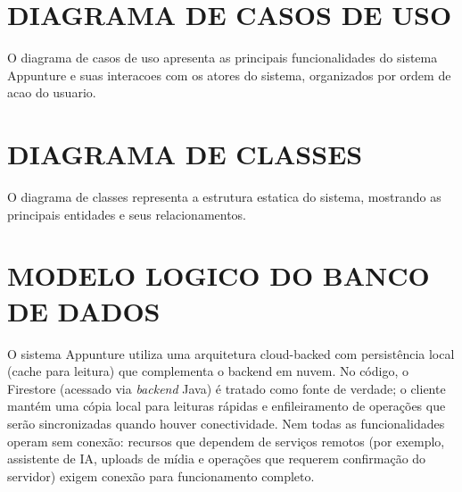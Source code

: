 
\begin{apendicesenv}

\chapter{DIAGRAMA DE CASOS DE USO}
\label{apendice:casos-uso}

O diagrama de casos de uso apresenta as principais funcionalidades do sistema Appunture e suas interacoes com os atores do sistema, organizados por ordem de acao do usuario.


\chapter{DIAGRAMA DE CLASSES}
\label{apendice:classes}

O diagrama de classes representa a estrutura estatica do sistema, mostrando as principais entidades e seus relacionamentos.


\chapter{MODELO LOGICO DO BANCO DE DADOS}
\label{apendice:modelo-logico}

O sistema Appunture utiliza uma arquitetura cloud-backed com persistência local (cache para leitura) que complementa o backend em nuvem. No código, o Firestore (acessado via \textit{backend} Java) é tratado como fonte de verdade; o cliente mantém uma cópia local para leituras rápidas e enfileiramento de operações que serão sincronizadas quando houver conectividade. Nem todas as funcionalidades operam sem conexão: recursos que dependem de serviços remotos (por exemplo, assistente de IA, uploads de mídia e operações que requerem confirmação do servidor) exigem conexão para funcionamento completo.


\end{apendicesenv}
